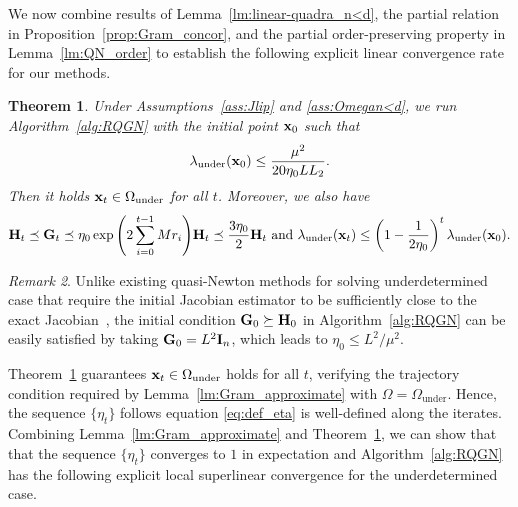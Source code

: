 \documentclass[11pt]{article}
\theoremstyle{plain}
\newtheorem{theorem}{Theorem}
\theoremstyle{definition}
\theoremstyle{remark}
\newtheorem{remark}[theorem]{Remark}
\theoremstyle{plain}
\def\G{{\bf G}}
\def\H{{\bf H}}
\def\I{{\bf I}}
\def\x{{\bf x}}
\begin{document}
We now combine results of Lemma~\ref{lm:linear-quadra_n<d}, the partial relation in Proposition~\ref{prop:Gram_concor}, and the partial order-preserving property in Lemma~\ref{lm:QN_order} to establish the following explicit linear convergence rate for our methods.
\begin{theorem}
\label{thm:linear_under}
    Under Assumptions~\ref{ass:Jlip} and \ref{ass:Omegan<d}, we run Algorithm~\ref{alg:RQGN} with the initial point $\x_0$ such that
    \begin{align}
        \label{eq:linear_initial_condi_2}
           \lambda_{\mathrm{under}}(\x_0)\leq \frac{\mu^2}{20\eta_0LL_2}.
    \end{align}
    Then it holds $\x_t\in\Omega_{\mathrm{under}}$ for all $t$. Moreover, we also have
    \begin{align}
\label{eq:induc_lambda_n<d}
   \H_t \preceq \G_t\preceq \eta_0\exp{\left(2\sum_{i=0}^{t-1}Mr_i\right)}\H_t \preceq \frac{3\eta_0}{2}\H_t~\text{and}~   \lambda_{\mathrm{under}}(\x_t)\leq \left(1-\frac{1}{2\eta_0}\right)^t\lambda_{\mathrm{under}}(\x_0).
\end{align}
\end{theorem}
\begin{remark}
Unlike existing quasi-Newton methods for solving underdetermined case that require the initial Jacobian estimator to be sufficiently close to the exact Jacobian~\citep{vater2024convergence,martinez1991quasi},
the initial condition $\G_0\succeq\H_0$ in Algorithm~\ref{alg:RQGN} can be easily satisfied by taking $\G_0=L^2\I_n$, which leads to $\eta_0\leq L^2/\mu^2$.  
\end{remark}
Theorem~\ref{thm:linear_under} guarantees $\x_t\in\Omega_{\mathrm{under}}$ holds for all $t$, verifying the trajectory condition required by Lemma~\ref{lm:Gram_approximate} with $\Omega=\Omega_{\mathrm{under}}$. 
Hence, the sequence $\{\eta_t\}$ follows equation \eqref{eq:def_eta} is well-defined along the iterates.
Combining Lemma~\ref{lm:Gram_approximate} and Theorem~\ref{thm:linear_under}, we can show that that the sequence $\{\eta_t\}$ converges to $1$ in expectation and Algorithm~\ref{alg:RQGN} has the following explicit local superlinear convergence for the underdetermined case.
\end{document}

